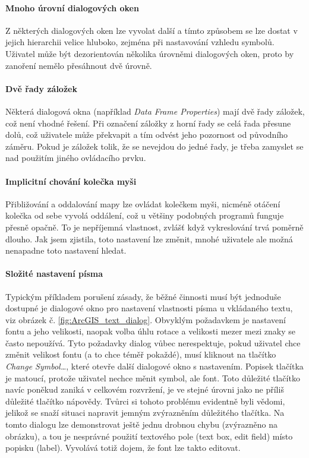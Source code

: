 \documentclass[a4paper,12pt,draft]{article}
\begin{document}
\paragraph*{Mnoho úrovní dialogových oken} Z některých dialogových oken
lze vyvolat další a tímto způsobem se lze dostat v jejich hierarchii velice
hluboko, zejména při nastavování vzhledu symbolů.  Uživatel může být
dezorientován několika úrovněmi dialogových oken, proto by zanoření
nemělo přesáhnout dvě úrovně.

\paragraph*{Dvě řady záložek} Některá dialogová okna (například
\emph{Data Frame Properties}) mají dvě řady záložek, což není vhodné
řešení. Při označení záložky z horní řady se celá řada přesune
dolů, což uživatele může překvapit a tím odvést jeho pozornost od
původního záměru. Pokud je záložek tolik, že se nevejdou do jedné
řady, je třeba zamyslet se nad použitím jiného ovládacího prvku.

\paragraph*{Implicitní chování kolečka myši} Přibližování a
oddalování mapy lze ovládat kolečkem myši, nicméně otáčení
kolečka od sebe vyvolá oddálení, což u většiny podobných programů
funguje přesně opačně. To je nepříjemná vlastnost, zvlášť když
vykreslování trvá poměrně dlouho. Jak jsem zjistila, toto nastavení
lze změnit, mnohé uživatele ale možná nenapadne toto nastavení hledat.

\paragraph*{Složité nastavení písma}  Typickým příkladem porušení
zásady, že běžné činnosti musí být jednoduše dostupné je dialogové
okno pro nastavení vlastnosti písma u vkládaného textu, viz obrázek
č. \ref{fig:ArcGIS_text_dialog}. Obvyklým požadavkem je nastavení
fontu a jeho velikosti, naopak volba úhlu rotace a velikosti mezer mezi
znaky se často nepoužívá. Tyto požadavky dialog vůbec nerespektuje,
pokud uživatel chce změnit velikost fontu (a to chce téměř pokaždé),
musí kliknout na tlačítko \emph{Change Symbol\ldots}, které otevře
další dialogové okno s nastavením. Popisek tlačítka je matoucí,
protože uživatel nechce měnit symbol, ale font. Toto důležité
tlačítko navíc poněkud zaniká v celkovém rozvržení, je ve stejné
úrovni jako ne příliš důležité tlačítko nápovědy. Tvůrci si
tohoto problému evidentně byli vědomi, jelikož se snaží situaci
napravit jemným zvýrazněním důležitého tlačítka. Na tomto dialogu
lze demonstrovat ještě jednu drobnou chybu (zvýrazněno na obrázku),
a tou je nesprávné použití textového pole (text box, edit field) místo
popisku (label). Vyvolává totiž dojem, že font lze takto editovat.
\end{document}
